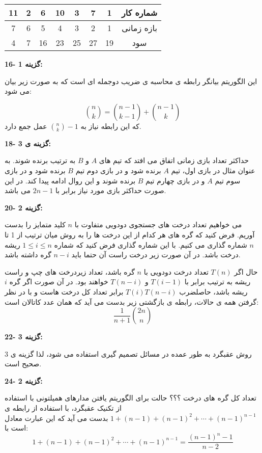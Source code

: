 \documentclass[12pt,fleqn,a4paper]{article}
\begin{document}
\begin{center}
\begin{tabular}{|c|c|c|c|c|c|c|c|}
\hline \rule[-1ex]{0pt}{2.5ex} 11 & 2 & 6 & 10 & 3 & 7 & 1 & شماره کار \\ 
\hline \rule[-1ex]{0pt}{2.5ex} 7 & 6 & 5 & 4 & 3 & 2 & 1 & بازه زمانی \\ 
\hline \rule[-1ex]{0pt}{2.5ex} 4 & 7 & 16 & 23 & 25 & 27 & 19 & سود \\ 
\hline 
\end{tabular}
\end{center}

{\bf 16- گزینه 1:}

این الگوریتم بیانگر رابطه ی محاسبه ی ضریب دوجمله ای است که به صورت زیر بیان می شود:

$$\binom{n}{k}=\binom{n-1}{k-1}+\binom{n-1}{k}$$
که این رابطه نیاز به 
$\binom{n}{k}-1$ 
عمل جمع دارد.

{\bf 18- گزینه ی 3:}

حداکثر تعداد بازی زمانی اتفاق می افتد که تیم های $A$ و $B$ به ترتیب برنده شوند. به عنوان مثال در بازی اول، تیم $A$ برنده شود و در بازی دوم تیم $B$  برنده شود و در بازی سوم تیم $A$ و در بازی چهارم تیم $B$ برنده شوند و این روال ادامه پیدا کند. در این صورت حداکثر بازی مورد نیاز برابر با $2n-1$ می باشد.

{\bf 20- گزینه 2:}

می خواهیم تعداد درخت های جستجوی دودویی متفاوت با $n$ کلید متمایز را بدست آوریم. فرض کنید که گره های هر کدام از این درخت ها را به روش میان ترتیب از 1 تا $n$ شماره گذاری می کنیم. با این شماره گذاری فرض کنید که شماره $1\leqslant i\leqslant n$ ریشه درخت باشد. در آن صورت زیر درخت راست آن حتما باید $n-i$ گره داشته باشد. 

حال اگر $T(n)$  تعداد درخت دودویی با $n$ گره باشد، تعداد زیردرخت های چپ و راست ریشه به ترتیب برابر با $T(i-1)$ و $T(n-i)$ خواهند بود. در آن صورت اگر گره $i$ ریشه باشد، حاصلضرب $T(i)T(n-i)$ برابر تعداد کل درخت هاست و با در نظر گرفتن همه ی حالات، رابطه ی بازگشتی زیر بدست می آید که همان عدد کاتالان است:
$$\dfrac{1}{n+1}\binom{2n}{n}$$

{\bf 22- گزینه 3:}

روش عقبگرد به طور عمده در مسائل تصمیم گیری استفاده می شود، لذا گزینه ی 3 صحیح است.

{\bf 24- گزینه 2:}

تعداد کل گره های درخت ؟؟؟ حالت برای الگوریتم یافتن مدارهای همیلتونی با استفاده از تکنیک عقبگرد، با استفاده از رابطه ی 
$1+(n-1)+(n-1)^2+\cdots+(n-1)^{n-1}$ 
بدست می آید که این عبارت معادل است با:
$$1+(n-1)+(n-1)^2+\cdots+(n-1)^{n-1}=\dfrac{(n-1)^n-1}{n-2}$$
\end{document}
